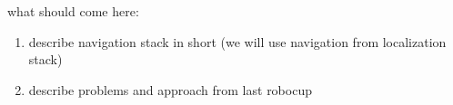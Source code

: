 %

what should come here:
\begin{enumerate}
	\item describe navigation stack in short (we will use navigation from localization stack)
	\item describe problems and approach from last robocup
\end{enumerate}